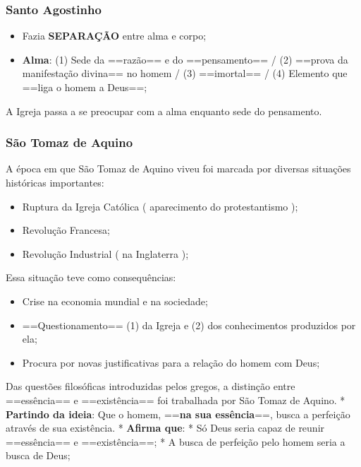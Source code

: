 \documentclass[
]{book}
\providecommand{\tightlist}{%
  \setlength{\itemsep}{0pt}\setlength{\parskip}{0pt}}
\theoremstyle{definition}
\theoremstyle{definition}
\theoremstyle{definition}
\theoremstyle{definition}
\theoremstyle{remark}
\begin{document}
\hypertarget{santo-agostinho}{%
\subsubsection{Santo Agostinho}\label{santo-agostinho}}

\begin{itemize}
\tightlist
\item
  Fazia \textbf{SEPARAÇÃO} entre alma e corpo;
\item
  \textbf{Alma}: (1) Sede da ==razão== e do ==pensamento== / (2) ==prova da manifestação divina== no homem / (3) ==imortal== / (4) Elemento que ==liga o homem a Deus==;
\end{itemize}

A Igreja passa a se preocupar com a alma enquanto sede do pensamento.

\hypertarget{suxe3o-tomaz-de-aquino}{%
\subsubsection{São Tomaz de Aquino}\label{suxe3o-tomaz-de-aquino}}

A época em que São Tomaz de Aquino viveu foi marcada por diversas situações históricas importantes:

\begin{itemize}
\tightlist
\item
  Ruptura da Igreja Católica ( aparecimento do protestantismo );
\item
  Revolução Francesa;
\item
  Revolução Industrial ( na Inglaterra );
\end{itemize}

Essa situação teve como consequências:

\begin{itemize}
\tightlist
\item
  Crise na economia mundial e na sociedade;
\item
  ==Questionamento== (1) da Igreja e (2) dos conhecimentos produzidos por ela;
\item
  Procura por novas justificativas para a relação do homem com Deus;
\end{itemize}

Das questões filosóficas introduzidas pelos gregos, a distinção entre ==essência== e ==existência== foi trabalhada por São Tomaz de Aquino.
* \textbf{Partindo da ideia}: Que o homem, ==\textbf{na sua essência}==, busca a perfeição através de sua existência.
* \textbf{Afirma que}:
* Só Deus seria capaz de reunir ==essência== e ==existência==;
* A busca de perfeição pelo homem seria a busca de Deus;
\end{document}
